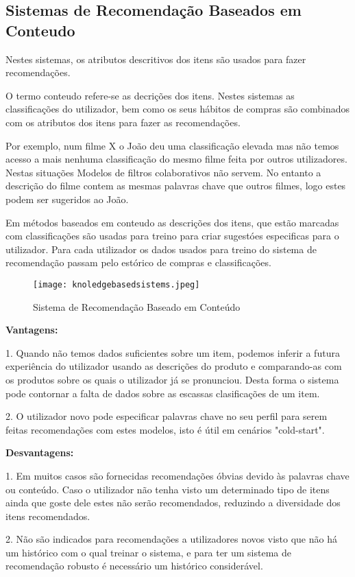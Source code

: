 \hfill
\subsection{Sistemas de Recomendação Baseados em Conteudo}
\hfill
\par Nestes sistemas, os atributos descritivos dos itens são usados para fazer recomendações.
\par O termo conteudo refere-se as decrições dos itens. Nestes sistemas as classificações do utilizador, bem como os seus hábitos de compras são combinados com os atributos dos itens para fazer as recomendações. 
\par Por exemplo, num filme X o João deu uma classificação elevada mas não temos acesso a mais nenhuma classificação do mesmo filme feita por outros utilizadores. Nestas situações Modelos de filtros colaborativos não servem. No entanto a descrição do filme contem as mesmas palavras chave que outros filmes, logo estes podem ser sugeridos ao João.
\par Em métodos baseados em conteudo as descrições dos itens, que estão marcadas com classificações são usadas para treino para criar sugestóes especificas para o utilizador. Para cada utilizador os dados usados para treino do sistema de recomendação passam pelo estórico de compras e classificações.\newline


\begin{figure}[H]
  \centering
    \texttt{[image: knoledgebasedsistems.jpeg]}
    \caption{Sistema de Recomendação Baseado em Conteúdo}
    \label{fig03}
\end{figure}

\textbf{Vantagens:}\hfill
\hfill
\par 1. Quando não temos dados suficientes sobre um item, podemos inferir a futura experiência do utilizador usando as descrições do produto e comparando-as com os produtos sobre os quais o utilizador já se pronunciou. Desta forma o sistema pode contornar a falta de dados sobre as escassas clasificações de um item.\newline
\hfill
\par 2. O utilizador novo pode especificar palavras chave no seu perfil para serem feitas recomendações com estes modelos, isto é útil em cenários "cold-start".\newline

\textbf{Desvantagens:}\hfill
\hfill
\par 1. Em muitos casos são fornecidas recomendações óbvias devido às palavras chave ou conteúdo. Caso o utilizador não tenha visto um determinado tipo de itens ainda que goste dele estes não serão recomendados, reduzindo a diversidade dos itens recomendados.\newline
\hfill
\par 2. Não são indicados para recomendações a utilizadores novos visto que não há um histórico com o qual treinar o sistema, e para ter um sistema de recomendação robusto é necessário um histórico considerável.\newline


